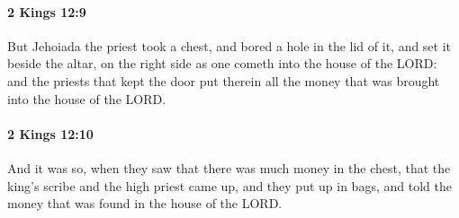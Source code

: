 		\paragraph{2 Kings 12:9} %
			\label{2KINGS-12-9}

			But Jehoiada the priest took a chest, and bored a hole in the lid of it, and set it beside the altar, on the right side as one cometh into the house of the LORD: and the priests that kept the door put therein all the money that was brought into the house of the LORD.


		\paragraph{2 Kings 12:10} %
			\label{2KINGS-12-10}

			And it was so, when they saw that there was much money in the chest, that the king’s scribe and the high priest came up, and they put up in bags, and told the money that was found in the house of the LORD.

